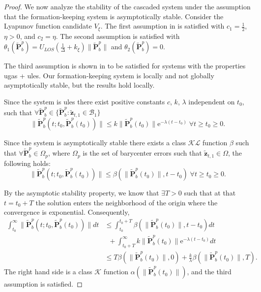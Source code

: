 \begin{proof}
We now analyze the stability of the cascaded system under the assumption that the formation-keeping system is asymptotically stable. Consider the Lyapunov function candidate $V_\xi$. The first assumption in \cite[Theorem 2.1]{lamnabhi-lagarrigue_2_2005} is satisfied with $c_1 = \tfrac{1}{2}$, $\eta>0$, and $c_2 = \eta$. The second assumption is satisfied with $\theta_1(\widetilde{\mathbf{P}}_b^p) = U_{LOS}(\frac{1}{\Delta} + k_\xi)\|\widetilde{\mathbf{P}}_b^p\|$ and $\theta_2(\widetilde{\mathbf{P}}_b^p) = 0$. 

The third assumption is shown in \cite[Remark 11]{pettersen_lyapunov_2017} to be satisfied for systems with the properties \gls{ugas} + \gls{ules}. Our formation-keeping system is locally and not globally asymptotically stable, but the results hold locally.

Since the system is \gls{ules} there exist positive constants $c$, $k$, $\lambda$ independent on $t_0$, such that $\forall \widetilde{\mathbf{P}}_b^p \in \{\widetilde{\mathbf{P}}_b^p \colon \tilde{\mathbf{z}}_{t,1} \in \mathcal{B}_1\}$
\begin{equation}
    \|\widetilde{\mathbf{P}}_b^p(t;t_0, \widetilde{\mathbf{P}}_b^p(t_0))\| \leq k\|\widetilde{\mathbf{P}}_b^p(t_0)\|\mathrm{e}^{-\lambda(t-t_0)} \; \forall t\geq t_0 \geq 0.
\end{equation}

Since the system is asymptotically stable there exists a class $\mathcal{KL}$ function $\beta$ such that $\forall \widetilde{\mathbf{P}}_b^p \in \Omega_p$, where $\Omega_p$ is the set of barycenter errors such that $\tilde{\mathbf{z}}_{t,1} \in \Omega$, the following holds:
\begin{equation}
    \|\widetilde{\mathbf{P}}_b^p(t;t_0, \widetilde{\mathbf{P}}_b^p(t_0))\| \leq \beta(\|\widetilde{\mathbf{P}}_b^p(t_0)\|,t-t_0) \; \forall t\geq t_0 \geq 0.
\end{equation}

By the asymptotic stability property, we know that $\exists T>0$ such that at that $t=t_0+T$ the solution enters the neighborhood of the origin where the convergence is exponential. Consequently,
\begin{equation}
    \begin{split}
        \int_{t_0}^\infty  \|\widetilde{\mathbf{P}}_b^p(t;t_0, \widetilde{\mathbf{P}}_b^p(t_0))\| dt &\leq \int_{t_0}^{t_0+T} \beta(\|\widetilde{\mathbf{P}}_b^p(t_0)\|,t-t_0)dt \\
        &\;\;+\int_{t_0+T}^{\infty} k\|\widetilde{\mathbf{P}}_b^p(t_0)\|\mathrm{e}^{-\lambda(t-t_0)}dt\\
        &\leq T\beta(\|\widetilde{\mathbf{P}}_b^p(t_0)\|,0) + \frac{k}{\lambda}\beta(\|\widetilde{\mathbf{P}}_b^p(t_0)\|,T).
    \end{split}
\end{equation}
The right hand side is a class $\mathcal{K}$ function $\alpha( \|\widetilde{\mathbf{P}}_b^p(t_0)\|)$, and the third assumption is satisfied.


\end{proof}
